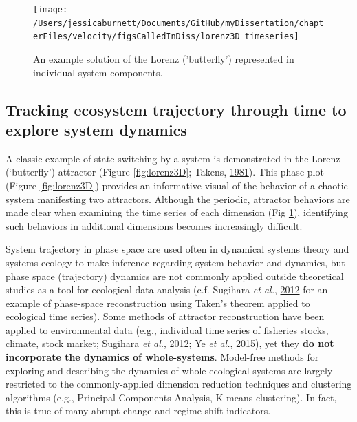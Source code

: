 \documentclass[12pt,twoside,openany]{reedthesis}
\begin{document}
\begin{figure}
\texttt{[image: /Users/jessicaburnett/Documents/GitHub/myDissertation/chapterFiles/velocity/figsCalledInDiss/lorenz3D\_timeseries]} \caption{An example solution of the Lorenz ('butterfly') represented in individual system components.}\label{fig:lorenz3Dts}
\end{figure}
\hypertarget{tracking-ecosystem-trajectory-through-time-to-explore-system-dynamics}{%
\subsection{Tracking ecosystem trajectory through time to explore system dynamics}\label{tracking-ecosystem-trajectory-through-time-to-explore-system-dynamics}}

A classic example of state-switching by a system is demonstrated in the Lorenz (`butterfly') attractor (Figure \ref{fig:lorenz3D}; Takens, \protect\hyperlink{ref-takens1981detecting}{1981}). This phase plot (Figure \ref{fig:lorenz3D}) provides an informative visual of the behavior of a chaotic system manifesting two attractors. Although the periodic, attractor behaviors are made clear when examining the time series of each dimension (Fig \ref{fig:lorenz3Dts}), identifying such behaviors in additional dimensions becomes increasingly difficult.

System trajectory in phase space are used often in dynamical systems theory and systems ecology to make inference regarding system behavior and dynamics, but phase space (trajectory) dynamics are not commonly applied outside theoretical studies as a tool for ecological data analysis (c.f. Sugihara \emph{et al.}, \protect\hyperlink{ref-sugihara2012detecting}{2012} for an example of phase-space reconstruction using Taken's theorem applied to ecological time series). Some methods of attractor reconstruction have been applied to environmental data (e.g., individual time series of fisheries stocks, climate, stock market; Sugihara \emph{et al.}, \protect\hyperlink{ref-sugihara2012detecting}{2012}; Ye \emph{et al.}, \protect\hyperlink{ref-ye2015equation}{2015}), yet they \textbf{do not incorporate the dynamics of whole-systems}. Model-free methods for exploring and describing the dynamics of whole ecological systems are largely restricted to the commonly-applied dimension reduction techniques and clustering algorithms (e.g., Principal Components Analysis, K-means clustering). In fact, this is true of many abrupt change and regime shift indicators.
\end{document}
